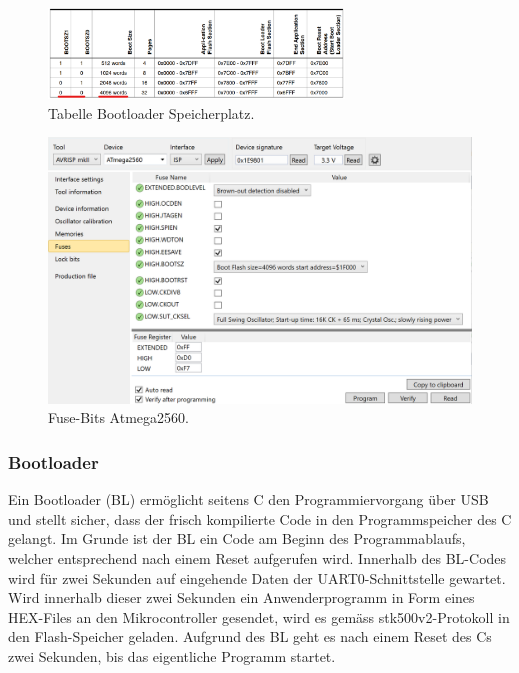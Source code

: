 \begin{figure}[H]
	\centering
	\includegraphics[width=0.7\textwidth]{graphics/Tabelle_Bootloader}
	\caption{Tabelle Bootloader Speicherplatz.\cite[S.320]{atmel_atmel_2014}}
	\label{fig:Tabelle_Bootloader}
\end{figure}

\begin{figure}[H]
	\centering
	\includegraphics[width=\textwidth]{graphics/AtmelStudio_Fuses}
	\caption{Fuse-Bits Atmega2560.}
	\label{fig:AtmelStudio_Fuses}
\end{figure}

\subsubsection{Bootloader}\label{Appendix:Inbetriebnahme_Bootloader}

Ein Bootloader (BL) ermöglicht seitens \textmu C den Programmiervorgang über USB und stellt sicher, dass der frisch kompilierte Code in den Programmspeicher des \textmu C gelangt. Im Grunde ist der BL ein Code am Beginn des Programmablaufs, welcher entsprechend nach einem Reset aufgerufen wird. Innerhalb des BL-Codes wird für zwei Sekunden auf eingehende Daten der UART0-Schnittstelle gewartet.
Wird innerhalb dieser zwei Sekunden ein Anwenderprogramm in Form eines HEX-Files an den Mikrocontroller gesendet, wird es gemäss stk500v2-Protokoll in den Flash-Speicher geladen.
Aufgrund des BL geht es nach einem Reset des \textmu Cs zwei Sekunden, bis das eigentliche Programm startet. \cite{atmel_avr068_2006}

